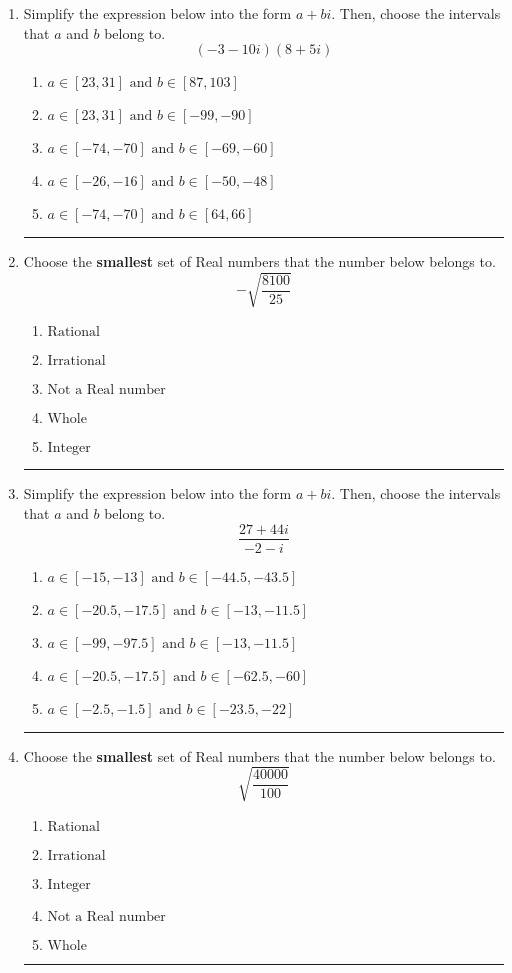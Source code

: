 \documentclass[14pt]{extbook}
\newcommand{\litem}[1]{\item#1\hspace*{-1cm}\rule{\textwidth}{0.4pt}}
\begin{document}
\begin{enumerate}
{\begin{enumerate}[label=\Alph*.]
\end{enumerate} }
\litem{
Simplify the expression below into the form $a+bi$. Then, choose the intervals that $a$ and $b$ belong to.\[ (-3 - 10 i)(8 + 5 i) \]\begin{enumerate}[label=\Alph*.]
\item \( a \in [23, 31] \text{ and } b \in [87, 103] \)
\item \( a \in [23, 31] \text{ and } b \in [-99, -90] \)
\item \( a \in [-74, -70] \text{ and } b \in [-69, -60] \)
\item \( a \in [-26, -16] \text{ and } b \in [-50, -48] \)
\item \( a \in [-74, -70] \text{ and } b \in [64, 66] \)

\end{enumerate} }
\litem{
Choose the \textbf{smallest} set of Real numbers that the number below belongs to.\[ -\sqrt{\frac{8100}{25}} \]\begin{enumerate}[label=\Alph*.]
\item \( \text{Rational} \)
\item \( \text{Irrational} \)
\item \( \text{Not a Real number} \)
\item \( \text{Whole} \)
\item \( \text{Integer} \)

\end{enumerate} }
\litem{
Simplify the expression below into the form $a+bi$. Then, choose the intervals that $a$ and $b$ belong to.\[ \frac{27 + 44 i}{-2 - i} \]\begin{enumerate}[label=\Alph*.]
\item \( a \in [-15, -13] \text{ and } b \in [-44.5, -43.5] \)
\item \( a \in [-20.5, -17.5] \text{ and } b \in [-13, -11.5] \)
\item \( a \in [-99, -97.5] \text{ and } b \in [-13, -11.5] \)
\item \( a \in [-20.5, -17.5] \text{ and } b \in [-62.5, -60] \)
\item \( a \in [-2.5, -1.5] \text{ and } b \in [-23.5, -22] \)

\end{enumerate} }
\litem{
Choose the \textbf{smallest} set of Real numbers that the number below belongs to.\[ \sqrt{\frac{40000}{100}} \]\begin{enumerate}[label=\Alph*.]
\item \( \text{Rational} \)
\item \( \text{Irrational} \)
\item \( \text{Integer} \)
\item \( \text{Not a Real number} \)
\item \( \text{Whole} \)


\end{enumerate}}
\end{enumerate}
\end{document}
